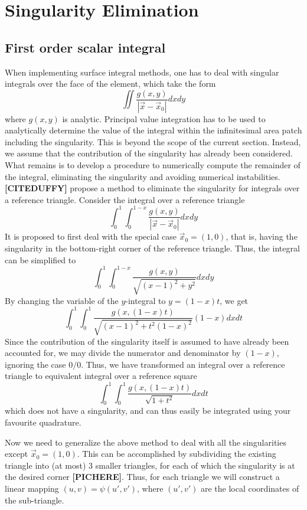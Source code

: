 \section{Singularity Elimination}

\subsection{First order scalar integral}
\label{appendix-singularity-1st-scalar}

When implementing surface integral methods, one has to deal with singular integrals over the face of the element, which take the form
\[ \iint \frac{g(x,y)}{|\vec{x} - \vec{x}_0|} dx dy \]
where $g(x,y)$ is analytic. Principal value integration has to be used to analytically determine the value of the integral within the infinitesimal area patch including the singularity.
This is beyond the scope of the current section. Instead, we assume that the contribution of the singularity has already been considered. What remains is to develop a procedure to
numerically compute the remainder of the integral, eliminating the singularity and avoiding numerical instabilities. \\

\noindent
\textbf{[CITEDUFFY]} propose a method to eliminate the singularity for integrals over a reference triangle. Consider the integral over a reference triangle
\[ \int_0^1 \int_0^{1-x} \frac{g(x,y)}{|\vec{x} - \vec{x}_0|} dx dy \]
It is proposed to first deal with the special case $\vec{x}_0 = (1,0)$, that is, having the singularity in the bottom-right corner of the reference triangle.
Thus, the integral can be simplified to
\[ \int_0^1 \int_0^{1-x} \frac{g(x,y)}{\sqrt{(x-1)^2 + y^2}} dx dy \]
By changing the variable of the $y$-integral to $y=(1-x)t$, we get
\[ \int_0^1 \int_0^1 \frac{g(x,(1-x)t)}{\sqrt{(x-1)^2 + t^2(1-x)^2}} (1-x)dx dt \]
Since the contribution of the singularity itself is assumed to have already been accounted for, we may divide the numerator and denominator by $(1-x)$, ignoring the case $0/0$.
Thus, we have transformed an integral over a reference triangle to equivalent integral over a reference square
\[ \int_0^1 \int_0^1 \frac{g(x,(1-x)t)}{\sqrt{1 + t^2}} dx dt \]
which does not have a singularity, and can thus easily be integrated using your favourite quadrature.

\noindent
Now we need to generalize the above method to deal with all the singularities except $\vec{x}_0 = (1,0)$. This can be accomplished by subdividing the existing triangle
into (at most) 3 smaller triangles, for each of which the singularity is at the desired corner \textbf{[PICHERE]}. Thus, for each triangle we will construct a linear
mapping $(u,v) = \psi(u', v')$, where $(u', v')$ are the local coordinates of the sub-triangle. \\

